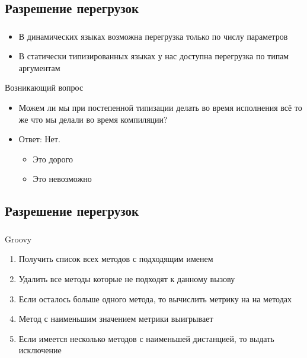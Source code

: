 \documentclass[t]{beamer}  %
\begin{document}
\subsection{Разрешение перегрузок}
\begin{frame}
	\frametitle{\insertsection} 
  	\framesubtitle{\insertsubsection}
	\begin{itemize}
       \item В динамических языках возможна перегрузка только по числу параметров
       \item В статически типизированных языках у нас доступна перегрузка по типам аргументам
    \end{itemize}
    \begin{block}{Возникающий вопрос}
		\begin{itemize}
          \item Можем ли мы при постепенной типизации делать во время исполнения всё то же что мы делали во время компиляции?
          \item<2> Ответ: Нет.
          		\begin{itemize}
                	\item Это дорого
                    \item Это невозможно
                \end{itemize}
		\end{itemize}
	\end{block}
\end{frame}


\subsection{Разрешение перегрузок}
\begin{frame}
	\frametitle{\insertsection} 
  	\framesubtitle{\insertsubsection}
    \begin{block}{Groovy}
		\begin{enumerate}
			\item  Получить список всех методов с подходящим именем
			\item  Удалить все методы которые не подходят к данному вызову
			\item  Если осталось больше одного метода, то вычислить метрику на на методах
			\item  Метод с наименьшим значением метрики выигрывает
			\item  Если имеется несколько методов с наименьшей дистанцией, то выдать исключение
		\end{enumerate}
	\end{block}
\end{frame}
\end{document}
